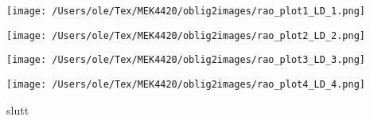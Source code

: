 \documentclass{beamer}
\begin{document}
\begin{frame}

\noindent
\begin{minipage}[t]{0.45\linewidth}
    \texttt{[image: /Users/ole/Tex/MEK4420/oblig2images/rao\_plot1\_LD\_1.png]}
\end{minipage}
\hspace{0.05\linewidth}
\begin{minipage}[t]{0.45\linewidth}
    \texttt{[image: /Users/ole/Tex/MEK4420/oblig2images/rao\_plot2\_LD\_2.png]}
\end{minipage}
\noindent
\begin{minipage}[t]{0.45\linewidth}
    \texttt{[image: /Users/ole/Tex/MEK4420/oblig2images/rao\_plot3\_LD\_3.png]}
\end{minipage}
\hspace{0.05\linewidth}
\begin{minipage}[t]{0.45\linewidth}
    \texttt{[image: /Users/ole/Tex/MEK4420/oblig2images/rao\_plot4\_LD\_4.png]}
\end{minipage}
\end{frame}

% 
\begin{frame}
slutt
\end{frame}
\end{document}

